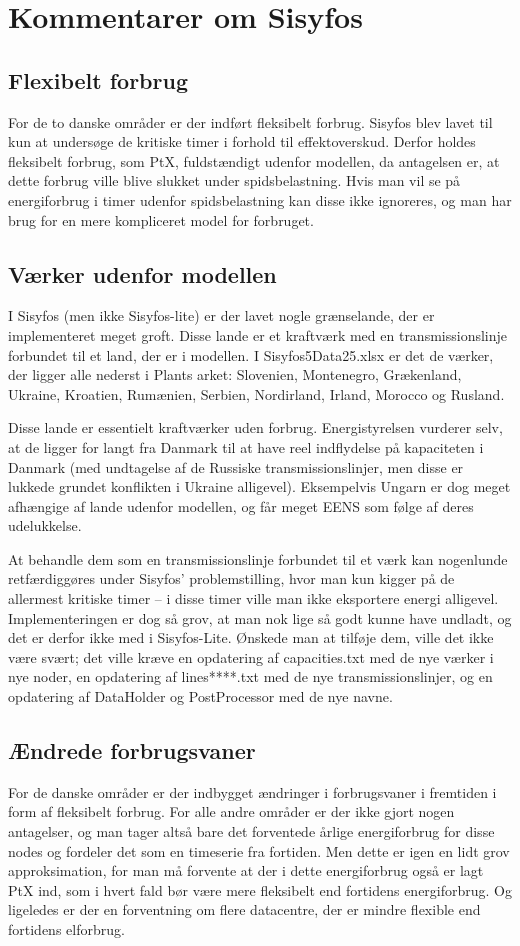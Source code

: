 \documentclass{article}
\begin{document}
\section{Kommentarer om Sisyfos}
\subsection{Flexibelt forbrug}
For de to danske områder er der indført fleksibelt forbrug. Sisyfos blev lavet til kun at undersøge de kritiske timer i forhold til effektoverskud. Derfor holdes fleksibelt forbrug, som PtX, fuldstændigt udenfor modellen, da antagelsen er, at dette forbrug ville blive slukket under spidsbelastning. Hvis man vil se på energiforbrug i timer udenfor spidsbelastning kan disse ikke ignoreres, og man har brug for en mere kompliceret model for forbruget.
\subsection{Værker udenfor modellen}
I Sisyfos (men ikke Sisyfos-lite) er der lavet nogle grænselande, der er implementeret meget groft. Disse lande er et kraftværk med en transmissionslinje forbundet til et land, der er i modellen. I Sisyfos5Data25.xlsx er det de værker, der ligger alle nederst i Plants arket: Slovenien, Montenegro, Grækenland, Ukraine, Kroatien, Rumænien, Serbien, Nordirland, Irland, Morocco og Rusland. 

Disse lande er essentielt kraftværker uden forbrug. Energistyrelsen vurderer selv, at de ligger for langt fra Danmark til at have reel indflydelse på kapaciteten i Danmark (med undtagelse af de Russiske transmissionslinjer, men disse er lukkede grundet konflikten i Ukraine alligevel). Eksempelvis Ungarn er dog meget afhængige af lande udenfor modellen, og får meget EENS som følge af deres udelukkelse.

At behandle dem som en transmissionslinje forbundet til et værk kan nogenlunde retfærdiggøres under Sisyfos' problemstilling, hvor man kun kigger på de allermest kritiske timer -- i disse timer ville man ikke eksportere energi alligevel. Implementeringen er dog så grov, at man nok lige så godt kunne have undladt, og det er derfor ikke med i Sisyfos-Lite. Ønskede man at tilføje dem, ville det ikke være svært; det ville kræve en opdatering af capacities.txt med de nye værker i nye noder, en opdatering af lines****.txt med de nye transmissionslinjer, og en opdatering af DataHolder og PostProcessor med de nye navne. 
\subsection{Ændrede forbrugsvaner}
For de danske områder er der indbygget ændringer i forbrugsvaner i fremtiden i form af fleksibelt forbrug. For alle andre områder er der ikke gjort nogen antagelser, og man tager altså bare det forventede årlige energiforbrug for disse nodes og fordeler det som en timeserie fra fortiden. Men dette er igen en lidt grov approksimation, for man må forvente at der i dette energiforbrug også er lagt PtX ind, som i hvert fald bør være mere fleksibelt end fortidens energiforbrug. Og ligeledes er der en forventning om flere datacentre, der er mindre flexible end fortidens elforbrug. 
\end{document}

